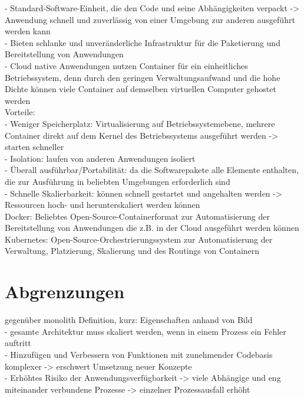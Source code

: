 - Standard-Software-Einheit, die den Code und seine Abhängigkeiten verpackt
 -> Anwendung schnell und zuverlässig von einer Umgebung zur anderen ausgeführt werden kann \\
- Bieten schlanke und unveränderliche Infrastruktur für die Paketierung und Bereitstellung von Anwendungen\\
- Cloud native Anwendungen nutzen Container für ein einheitliches Betriebssystem, denn durch den geringen Verwaltungsaufwand und die hohe Dichte können viele Container auf demselben virtuellen Computer gehostet werden\\

Vorteile: \\
- Weniger Speicherplatz: Virtualisierung auf Betriebssystemebene, mehrere Container direkt auf dem Kernel des Betriebssystems ausgeführt werden -> starten schneller\\
- Isolation: laufen von anderen Anwendungen isoliert\\
- Überall ausführbar/Portabilität: da die Softwarepakete alle Elemente enthalten, die zur Ausführung in beliebten Umgebungen erforderlich sind\\
- Schnelle Skalierbarkeit: können schnell gestartet und angehalten werden -> Ressourcen hoch- und herunterskaliert werden können\\

Docker: Beliebtes Open-Source-Containerformat zur Automatisierung der Bereitstellung von Anwendungen die z.B. in der Cloud ausgeführt werden können\\

Kubernetes: Open-Source-Orchestrierungssystem zur Automatisierung der Verwaltung, Platzierung, Skalierung und des Routings von Containern\\

\section{Abgrenzungen}
gegenüber monolith
Definition, kurz: Eigenschaften anhand von Bild\\

- gesamte Architektur muss skaliert werden, wenn in einem Prozess ein Fehler auftritt\\
- Hinzufügen und Verbessern von Funktionen mit zunehmender Codebasis komplexer
 -> erschwert Umsetzung neuer Konzepte\\
- Erhöhtes Risiko der Anwendungsverfügbarkeit -> viele Abhängige und eng miteinander verbundene Prozesse -> einzelner Prozessausfall erhöht\\

